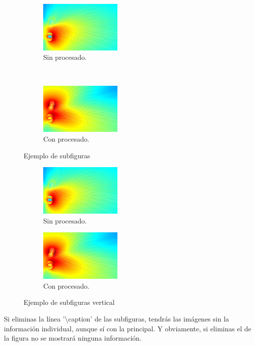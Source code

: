\begin{lstlisting}[style=Latex-color]

\end{lstlisting}
\begin{figure}[h]
    \centering
    \begin{subfigure}[b]{0.4\textwidth}
    	\centering
        \includegraphics[width=4cm]{archivos/subs-sin}
        \caption{Sin procesado.}
        \label{fig:gull1}
    \end{subfigure}
    ~ %
    \begin{subfigure}[b]{0.4\textwidth}
    	\centering
        \includegraphics[width=4cm]{archivos/subs-con}
        \caption{Con procesado.}
        \label{fig:tiger1}
    \end{subfigure}
    \caption{Ejemplo de subfiguras}\label{sistemass1}
\end{figure}

\begin{figure}[h]
    \centering
    \begin{subfigure}[b]{\textwidth}
    	\centering
        \includegraphics[width=4cm]{archivos/subs-sin}
        \caption{Sin procesado.}
        \label{fig:gull2}
    \end{subfigure}
    
    \begin{subfigure}[b]{\textwidth}
    	\centering
        \includegraphics[width=4cm]{archivos/subs-con}
        \caption{Con procesado.}
        \label{fig:tiger2}
    \end{subfigure}
    \caption{Ejemplo de subfiguras vertical}\label{sistemass2}
\end{figure}

Si eliminas la línea '\textbackslash caption' de las subfiguras, tendrás las imágenes sin la información individual, aunque sí con la principal. Y obviamente, si eliminas el de la figura no se mostrará ninguna información.
